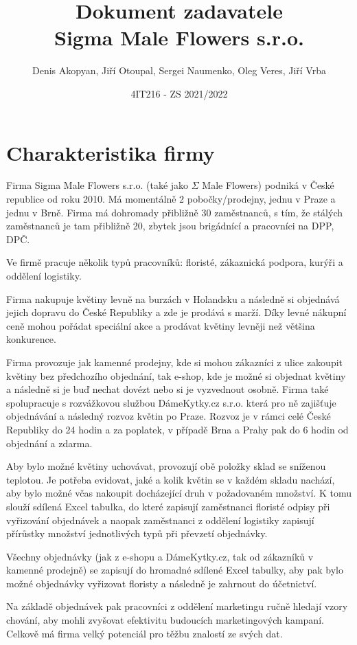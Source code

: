 \documentclass{article}
\title{Dokument zadavatele \\ Sigma Male Flowers s.r.o.}
\author{Denis Akopyan, Jiří Otoupal, Sergei Naumenko, Oleg Veres, Jiří Vrba}
\date{4IT216 - ZS 2021/2022}
\begin{document}
\maketitle
\clearpage

\section*{Charakteristika firmy}

Firma Sigma Male Flowers s.r.o. (také jako $\Sigma$ Male Flowers) podniká v České republice od roku 2010.
Má momentálně 2 pobočky/prodejny, jednu v Praze a jednu v Brně.
Firma má dohromady přibližně 30 zaměstnanců, s tím, že stálých zaměstnanců je tam přibližně 20, zbytek
jsou brigádnící a pracovníci na DPP, DPČ.

Ve firmě pracuje několik typů pracovníků: floristé, zákaznická podpora, kurýři a oddělení logistiky.

Firma nakupuje květiny levně na burzách v Holandsku a následně si objednává jejich dopravu do České Republiky a zde je prodává s marží. Díky levné nákupní ceně mohou pořádat speciální akce a prodávat květiny levněji než většina konkurence.

Firma provozuje jak kamenné prodejny, kde si mohou zákazníci z ulice zakoupit květiny bez předchozího objednání, tak e-shop, kde je možné si objednat květiny a následně si je buď nechat dovézt nebo si je vyzvednout osobně.
Firma také spolupracuje s rozvážkovou službou DámeKytky.cz s.r.o. která pro ně zajišťuje objednávání a následný rozvoz květin po Praze.
Rozvoz je v rámci celé České Republiky do 24 hodin a za poplatek, v případě Brna a Prahy pak do 6 hodin od objednání a zdarma.

Aby bylo možné květiny uchovávat, provozují obě položky sklad se sníženou teplotou.
Je potřeba evidovat, jaké a kolik květin se v každém skladu nachází, aby bylo možné včas nakoupit docházející druh v požadovaném množství.
K tomu slouží sdílená Excel tabulka, do které zapisují zaměstnanci floristé odpisy při vyřizování objednávek a naopak zaměstnanci z oddělení logistiky zapisují přírůstky množství jednotlivých typů při převzetí objednávky.

Všechny objednávky (jak z e-shopu a DámeKytky.cz, tak od zákazníků v kamenné prodejně) se zapisují do hromadné sdílené Excel tabulky, aby pak bylo možné objednávky vyřizovat floristy a následně je zahrnout do účetnictví.

Na základě objednávek pak pracovníci z oddělení marketingu ručně hledají vzory chování, aby mohli zvyšovat efektivitu budoucích marketingových kampaní. Celkově má firma velký potenciál pro těžbu znalostí ze svých dat.
\end{document}
